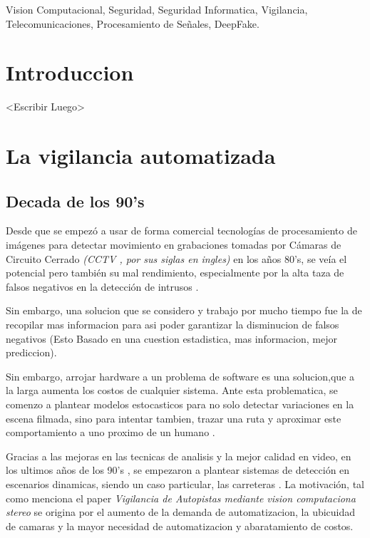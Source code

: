 \documentclass[conference]{IEEEtran}
\begin{document}
\begin{IEEEkeywords}
Vision Computacional, Seguridad, Seguridad Informatica, Vigilancia, Telecomunicaciones, Procesamiento de Se\~nales,
DeepFake.
\end{IEEEkeywords}

\section{Introduccion}

<Escribir Luego>

\section{La vigilancia automatizada}

\subsection{Decada de los 90's}

Desde que se empezó a usar de forma comercial tecnologías de procesamiento de imágenes para detectar movimiento en
grabaciones tomadas por Cámaras de Circuito Cerrado \textit{(CCTV , por sus siglas en ingles)} en los a\~nos 80's,
se veía el potencial pero también su mal rendimiento, especialmente por la alta taza de falsos negativos 
en la detección de intrusos \citep{Sage}.

Sin embargo, una solucion que se considero y trabajo por mucho tiempo fue la de recopilar mas informacion para asi poder
garantizar la disminucion de falsos negativos (Esto Basado en una cuestion estadistica, mas informacion, mejor prediccion).

Sin embargo, arrojar hardware a un problema de software es una solucion,que a la larga aumenta los costos de cualquier sistema.
Ante esta problematica, se comenzo a plantear modelos estocasticos para no solo detectar variaciones en la escena filmada, sino
para intentar tambien, trazar una ruta y aproximar este comportamiento a uno proximo de un humano \citep{Sage}.

Gracias a las mejoras en las tecnicas de analisis y la mejor calidad en video, en los ultimos a\~nos de los 90's , se empezaron
a plantear sistemas de detección en escenarios dinamicas, siendo un caso particular, las carreteras \citep{Manendez}. La motivación,
tal como menciona el paper \textit{Vigilancia de Autopistas mediante vision computaciona stereo} \citep[Abstract]{Manendez}
se origina por el aumento de la demanda de automatizacion, la ubicuidad de camaras y la mayor necesidad de automatizacion y abaratamiento
de costos.
\end{document}
